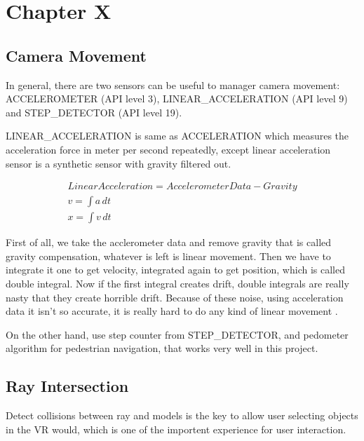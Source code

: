 \label{ChapterX}
\chapter{Chapter X}

\section{Camera Movement}

In general, there are two sensors can be useful to manager camera movement: ACCELEROMETER (API level 3), LINEAR\_ACCELERATION (API level 9) and STEP\_DETECTOR (API level 19). 

LINEAR\_ACCELERATION is same as ACCELERATION which measures the acceleration force in meter per second repeatedly, except linear acceleration sensor is a synthetic sensor with gravity filtered out. 

\[
\begin{array}{lr}
Linear Acceleration = Accelerometer Data - Gravity \\
v = \int a\,dt \\
x = \int v\,dt
\end{array}
\]

First of all, we take the acclerometer data and remove gravity that is called gravity compensation, whatever is left is linear movement. Then we have to integrate it one to get velocity, integrated again to get position, which is called double integral. Now if the first integral creates drift, double integrals are really nasty that they create horrible drift. Because of these noise, using acceleration data it isn't so accurate, it is really hard to do any kind of linear movement \parencite{GoogleTechTalks.sensor-fusion.2010}.

On the other hand, use step counter from STEP\_DETECTOR, and pedometer algorithm for pedestrian navigation, that works very well in this project.





\section{Ray Intersection}

Detect collisions between ray and models is the key to allow user selecting objects in the VR would, which is one of the importent experience for user interaction.

